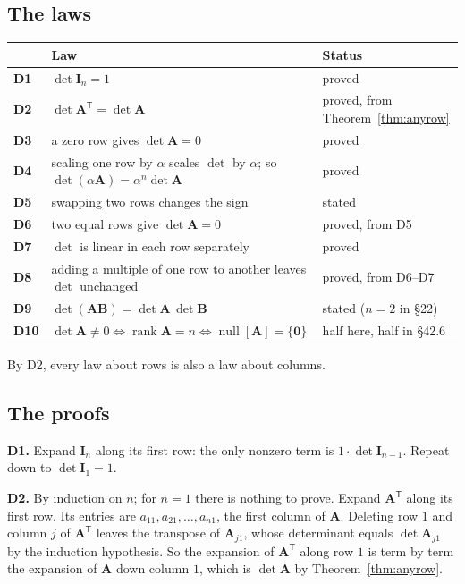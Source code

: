 \documentclass[11pt]{article}
\theoremstyle{plain}
\theoremstyle{definition}
\theoremstyle{remark}
\newcommand{\vc}[1]{\mathbf{#1}}
\newcommand{\mt}[1]{\mathbf{#1}}
\newcommand{\T}{^{\mathsf{T}}}
\newcommand{\nullsp}[1]{\operatorname{null}[#1]}
\DeclareMathOperator{\rank}{rank}
\begin{document}
\subsection{The laws}
\begin{center}
\renewcommand{\arraystretch}{1.4}
\begin{tabular}{@{}l p{8.4cm} l@{}}
\toprule
 & \textbf{Law} & \textbf{Status} \\
\midrule
\textbf{D1} & $\det\mt{I}_n=1$ & proved \\
\textbf{D2} & $\det\mt{A}\T=\det\mt{A}$ & proved, from Theorem~\ref{thm:anyrow} \\
\textbf{D3} & a zero row gives $\det\mt{A}=0$ & proved \\
\textbf{D4} & scaling one row by $\alpha$ scales $\det$ by $\alpha$; so $\det(\alpha\mt{A})=\alpha^{n}\det\mt{A}$ & proved \\
\textbf{D5} & swapping two rows changes the sign & stated \\
\textbf{D6} & two equal rows give $\det\mt{A}=0$ & proved, from D5 \\
\textbf{D7} & $\det$ is linear in each row separately & proved \\
\textbf{D8} & adding a multiple of one row to another leaves $\det$ unchanged & proved, from D6--D7 \\
\textbf{D9} & $\det(\mt{A}\mt{B})=\det\mt{A}\,\det\mt{B}$ & stated ($n=2$ in \S22) \\
\textbf{D10} & $\det\mt{A}\neq0\iff\rank\mt{A}=n\iff\nullsp{\mt{A}}=\{\vc{0}\}$ & half here, half in \S42.6 \\
\bottomrule
\end{tabular}
\end{center}

\noindent By D2, every law about rows is also a law about columns.

\subsection{The proofs}
\textbf{D1.} Expand $\mt{I}_n$ along its first row: the only nonzero term is
$1\cdot\det\mt{I}_{n-1}$. Repeat down to $\det\mt{I}_1=1$.

\textbf{D2.} By induction on $n$; for $n=1$ there is nothing to prove. Expand
$\mt{A}\T$ along its first row. Its entries are $a_{11},a_{21},\dots,a_{n1}$,
the first column of $\mt{A}$. Deleting row $1$ and column $j$ of $\mt{A}\T$
leaves the transpose of $\mt{A}_{j1}$, whose determinant equals
$\det\mt{A}_{j1}$ by the induction hypothesis. So the expansion of $\mt{A}\T$
along row $1$ is term by term the expansion of $\mt{A}$ down column $1$, which is
$\det\mt{A}$ by Theorem~\ref{thm:anyrow}.
\end{document}
